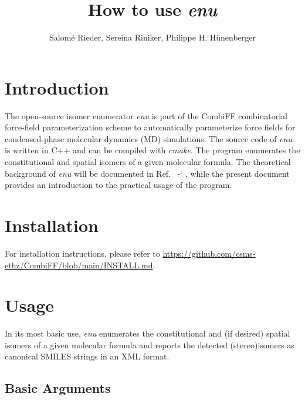 \documentclass[a4paper,11pt]{article}
\title{How to use \textit{enu}}
\author{Salom\'e Rieder, Sereina Riniker, Philippe H. Hünenberger}
\date{}
\newcommand*{\citen}[1]{%
  \begingroup
    \romannumeral-`\x %
    \setcitestyle{numbers}%
    \cite{#1}%
  \endgroup   
}
\begin{document}
\pagestyle{plain}
\maketitle


\section{Introduction}

The open-source isomer enumerator \textit{enu} is part of the CombiFF combinatorial force-field parameterization scheme to automatically parameterize force fields for condensed-phase molecular dynamics (MD) simulations.\cite{Oliveira2020,Oliveira2021} The source code of \textit{enu} is written in C++ and can be compiled with \textit{cmake}. The program enumerates the constitutional and spatial isomers of a given molecular formula. The theoretical background of \textit{enu} will be documented in Ref.~\citen{Rieder2022}, while the present document provides an introduction to the practical usage of the program.

\section{Installation}

For installation instructions, please refer to \url{https://github.com/csms-ethz/CombiFF/blob/main/INSTALL.md}.

\section{Usage}

In its most basic use, \textit{enu} enumerates the constitutional and (if desired) spatial isomers of a given molecular formula and reports the detected (stereo)isomers as canonical SMILES strings in an XML format.

\subsection{Basic Arguments}
\end{document}
